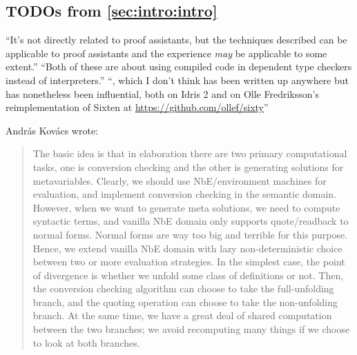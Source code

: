 \begin{subappendices}

\section{TODOs from \autoref{sec:intro:intro}}
``It's not directly related to proof assistants, but the techniques described can be applicable to proof assistants and the experience \emph{may} be applicable to some extent.''
``Both of these are about using compiled code in dependent type checkers instead of interpreters.''
``, which I don't think has been written up anywhere but has nonetheless been influential, both on Idris 2 and on Olle Fredriksson's reimplementation of Sixten at \url{https://github.com/ollef/sixty}''


András Kovács wrote:
\begin{quotation}
The basic idea is that in elaboration there are two primary computational tasks, one is conversion checking and the other is generating solutions for metavariables. Clearly, we should use NbE/environment machines for evaluation, and implement conversion checking in the semantic domain. However, when we want to generate meta solutions, we need to compute syntactic terms, and vanilla NbE domain only supports quote/readback to normal forms. Normal forms are way too big and terrible for this purpose. Hence, we extend vanilla NbE domain with lazy non-deterministic choice between two or more evaluation strategies. In the simplest case, the point of divergence is whether we unfold some class of definitions or not. Then, the conversion checking algorithm can choose to take the full-unfolding branch, and the quoting operation can choose to take the non-unfolding branch. At the same time, we have a great deal of shared computation between the two branches; we avoid recomputing many things if we choose to look at both branches.


\end{quotation}
\end{subappendices}
